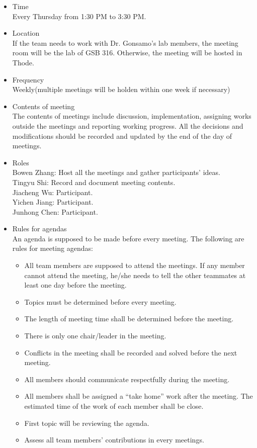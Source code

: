 \documentclass{article}
\begin{document}
\begin{itemize}
    \item Time\\ Every Thursday from 1:30 PM to 3:30 PM.
    \item Location \\ If the team needs to work with Dr. Gonsamo's lab members, the meeting room
    will be the lab of GSB 316. Otherwise, the meeting will be hosted in Thode.
    \item Frequency \\ Weekly(multiple meetings will be holden within one week if necessary)
    \item Contents of meeting\\
    The contents of meetings include discussion, implementation, assigning works outside 
    the meetings and reporting working progress. All the decisions and modifications
    should be recorded and updated by the end of the day of meetings.
    \item Roles\\ 
    Bowen Zhang: Host all the meetings and gather participants' ideas.\\
    Tingyu Shi: Record and document meeting contents.\\
    Jiacheng Wu: Participant.\\
    Yichen Jiang: Participant.\\
    Junhong Chen: Participant.
    \item Rules for agendas\\
    An agenda is supposed to be made before every meeting. The following are rules for
    meeting agendas:
    \begin{itemize}
    \item All team members are supposed to attend the meetings. If any member cannot attend the meeting, he/she needs to tell the other teammates at least one day before the meeting.
    \item Topics must be determined before every meeting.
    \item The length of meeting time shall be determined before the meeting.
    \item There is only one chair/leader in the meeting.
    \item Conflicts in the meeting shall be recorded and solved before the next meeting.
    \item All members should communicate respectfully during the meeting.
    \item All members shall be assigned a “take home” work after the meeting. The estimated time of the work of each member shall be close.
    \item First topic will be reviewing the agenda.
    \item Assess all team members’ contributions in every meetings.
    \end{itemize}
\end{itemize}
\end{document}

